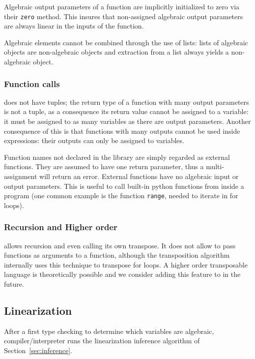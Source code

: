 Algebraic output parameters of a function are implicitly initialized
to zero via their \lstinline+zero+ method. This insures that
non-assigned algebraic output parameters are always linear in the
inputs of the function.

Algebraic elements cannot be combined through the use of lists: lists
of algebraic objects are non-algebraic objects and extraction from a
list always yields a non-algebraic object.


\subsubsection{Function calls}
\tALpy{} does not have tuples; the return type of a function with many
output parameters is not a tuple, as a consequence its return value
cannot be assigned to a variable: it must be assigned to as many
variables as there are output parameters.  Another consequence of this
is that functions with many outputs cannot be used inside expressions:
their outputs can only be assigned to variables.

Function names not declared in the library are simply regarded as
external functions. They are assumed to have one return parameter,
thus a multi-assignment will return an error. External functions have
no algebraic input or output parameters. This is useful to call
built-in python functions from inside a \tALpy{} program (one common
example is the function \lstinline+range+, needed to iterate in for
loops).

\subsubsection{Recursion and Higher order}
\tALpy{} allows recursion and even calling its own transpose. It does
not allow to pass functions as arguments to a function, although the
transposition algorithm internally uses this technique to transpose
for loops. A higher order transposable language is theoretically
possible and we consider adding this feature to \tALpy{} in the
future.

\subsection{Linearization}
\label{sec:linearization}

After a first type checking to determine which variables are
algebraic, \tALpy{} compiler/interpreter runs the linearization
inference algorithm of Section~\ref{sec:inference}. 

